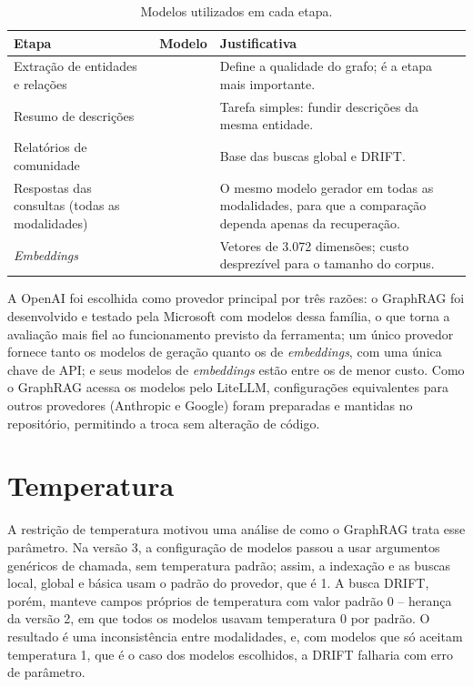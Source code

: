 \begin{table}[htb]
\centering
\caption{Modelos utilizados em cada etapa.}
\label{tab-modelos}
\footnotesize
\begin{tabular}{L{4.6cm} L{3.4cm} L{6.2cm}}
\toprule
\textbf{Etapa} & \textbf{Modelo} & \textbf{Justificativa} \\
\midrule
Extração de entidades e relações &  & Define a qualidade do grafo; é a etapa mais importante. \\
Resumo de descrições &  & Tarefa simples: fundir descrições da mesma entidade. \\
Relatórios de comunidade &  & Base das buscas global e DRIFT. \\
Respostas das consultas (todas as modalidades) &  & O mesmo modelo gerador em todas as modalidades, para que a comparação dependa apenas da recuperação. \\
\textit{Embeddings} &  & Vetores de 3.072 dimensões; custo desprezível para o tamanho do corpus. \\
\bottomrule
\end{tabular}
\end{table}

A OpenAI foi escolhida como provedor principal por três razões: o GraphRAG foi desenvolvido e testado pela Microsoft com modelos dessa família, o que torna a avaliação mais fiel ao funcionamento previsto da ferramenta; um único provedor fornece tanto os modelos de geração quanto os de \textit{embeddings}, com uma única chave de API; e seus modelos de \textit{embeddings} estão entre os de menor custo. Como o GraphRAG acessa os modelos pelo LiteLLM, configurações equivalentes para outros provedores (Anthropic e Google) foram preparadas e mantidas no repositório, permitindo a troca sem alteração de código.


\section{Temperatura}
\label{sec-indexacao-temperatura}

A restrição de temperatura motivou uma análise de como o GraphRAG trata esse parâmetro. Na versão 3, a configuração de modelos passou a usar argumentos genéricos de chamada, sem temperatura padrão; assim, a indexação e as buscas local, global e básica usam o padrão do provedor, que é 1. A busca DRIFT, porém, manteve campos próprios de temperatura com valor padrão 0 -- herança da versão 2, em que todos os modelos usavam temperatura 0 por padrão. O resultado é uma inconsistência entre modalidades, e, com modelos que só aceitam temperatura 1, que é o caso dos modelos escolhidos, a DRIFT falharia com erro de parâmetro.

